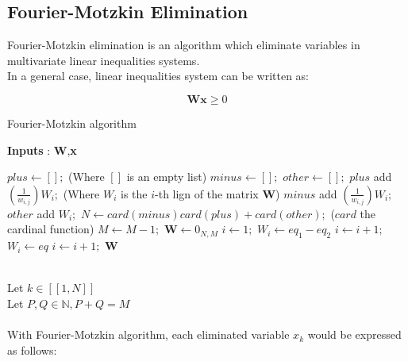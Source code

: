 \documentclass{article}
\begin{document}
\newpage
\printbibliography
\newpage
\begin{appendices}
\section{Fourier-Motzkin Elimination}
Fourier-Motzkin elimination \cite{motzkin1952theory} is an algorithm which eliminate variables in multivariate linear inequalities systems.
\\
In a general case, linear inequalities system can be written as: 

\begin{equation*}
\textbf{W}\textbf{x}\geqslant0 
\end{equation*}



\begin{algorithm}
    \caption{Fourier-Motzkin algorithm} 
    \hspace*{\algorithmicindent} \textbf{Inputs} : \textbf{W},\textbf{x}
    
    \begin{algorithmic} 
        
    \STATE $plus \gets [];$ (Where $[]$ is an empty list)
    \STATE $minus \gets [];$
    \STATE $other \gets [];$
    \STATE $plus$ add $(\frac{1}{w_{i,j}})W_{i};$ (Where $W_{i}$ is the $i$-th lign of the matrix \textbf{W})
    \ELSE 
    \STATE $minus$ add $(\frac{1}{w_{i,j}})W_{i};$
    \ENDIF
    \ELSE
    \STATE $other$ add $W_{i};$
    \ENDIF
    \ENDFOR
    \STATE $N \gets card(minus)card(plus) + card(other);$ ($card$ the cardinal function)
    \STATE $M \gets M-1;$
    \STATE $\textbf{W}\gets 0_{N,M}$
    \STATE $i \gets 1;$
    \STATE $W_{i} \gets eq_{1}-eq_{2}$
    \STATE $i \gets i+1;$
    \ENDFOR
    \ENDFOR
    \STATE $W_{i} \gets eq$
    \STATE $i \gets i+1;$
    \ENDFOR
    \ENDWHILE 
    \RETURN \textbf{W}
    \end{algorithmic}
    \end{algorithm}
    \
    \\
    Let $k \in [\![1,N]\!]$\\
    Let $P,Q \in \mathbb{N}, P+Q=M$ \\\\
    With Fourier-Motzkin algorithm, each eliminated variable $x_{k}$ would be expressed as follows: 


\end{appendices}
\end{document}
